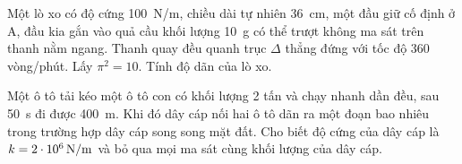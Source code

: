 \begin{ex}
	\loigiai{
		
	}
\end{ex}
\begin{ex}
	Một lò xo có độ cứng \SI{100}{\newton/\meter}, chiều dài tự nhiên \SI{36}{\centi\meter}, một đầu giữ cố định ở A, đầu kia gắn vào quả cầu khối lượng \SI{10}{\gram} có thể trượt không ma sát trên thanh nằm ngang. Thanh quay đều quanh trục $\Delta$ thẳng đứng với tốc độ 360 vòng/phút. Lấy $\pi^2=10$. Tính độ dãn của lò xo.
	\loigiai{
		
	}
\end{ex}
\begin{ex}
	Một ô tô tải kéo một ô tô con có khối lượng 2 tấn và chạy nhanh dần đều, sau \SI{50}{\second} đi được \SI{400}{\meter}. Khi đó dây cáp nối hai ô tô dãn ra một đoạn bao nhiêu trong trường hợp dây cáp song song mặt đất. Cho biết độ cứng của dây cáp là $k=\SI{2E6}{\newton/\meter}$ và bỏ qua mọi ma sát cùng khối lượng của dây cáp.
	\loigiai{
		
	}
\end{ex}
